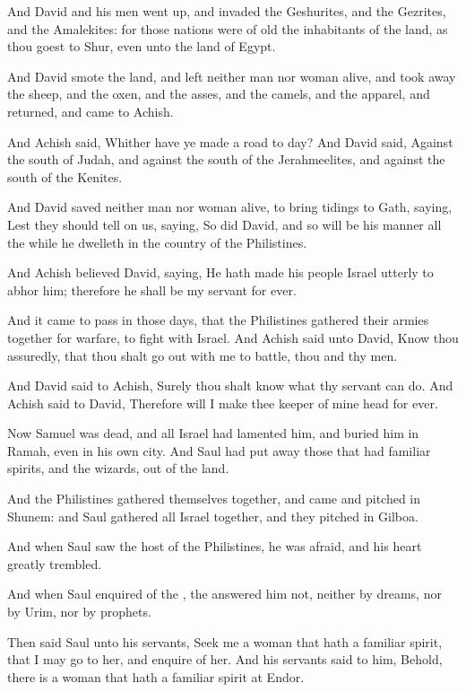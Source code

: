 \Verse And David and his men went up, and invaded the Geshurites, and the Gezrites, and the Amalekites: for those nations were of old the inhabitants of the land, as thou goest to Shur, even unto the land of Egypt.

\Verse And David smote the land, and left neither man nor woman alive, and took away the sheep, and the oxen, and the asses, and the camels, and the apparel, and returned, and came to Achish.

\Verse And Achish said, Whither have ye made a road to day? And David said, Against the south of Judah, and against the south of the Jerahmeelites, and against the south of the Kenites.

\Verse And David saved neither man nor woman alive, to bring tidings to Gath, saying, Lest they should tell on us, saying, So did David, and so will be his manner all the while he dwelleth in the country of the Philistines.

\Verse And Achish believed David, saying, He hath made his people Israel utterly to abhor him; therefore he shall be my servant for ever.


\Chapter
\Verse And it came to pass in those days, that the Philistines gathered their armies together for warfare, to fight with Israel. And Achish said unto David, Know thou assuredly, that thou shalt go out with me to battle, thou and thy men.

\Verse And David said to Achish, Surely thou shalt know what thy servant can do. And Achish said to David, Therefore will I make thee keeper of mine head for ever.

\Verse Now Samuel was dead, and all Israel had lamented him, and buried him in Ramah, even in his own city. And Saul had put away those that had familiar spirits, and the wizards, out of the land.

\Verse And the Philistines gathered themselves together, and came and pitched in Shunem: and Saul gathered all Israel together, and they pitched in Gilboa.

\Verse And when Saul saw the host of the Philistines, he was afraid, and his heart greatly trembled.

\Verse And when Saul enquired of the \LORD, the \LORD answered him not, neither by dreams, nor by Urim, nor by prophets.

\Verse Then said Saul unto his servants, Seek me a woman that hath a familiar spirit, that I may go to her, and enquire of her. And his servants said to him, Behold, there is a woman that hath a familiar spirit at Endor.

